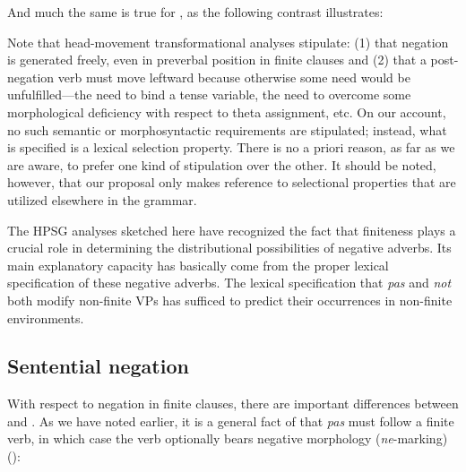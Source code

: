\documentclass[output=paper
 	        ,biblatex
                ,babelshorthands
                ,newtxmath
                ,draftmode
                ,colorlinks, citecolor=brown
]{langscibook}
\begin{document}
\begin{exe}
\begin{xlist}
\begin{exe}
\begin{xlist}
\noindent And much the same is true for , as the
following contrast illustrates:

\eal
\ex[*]{
\gll Robin  [(ne) pas \jbssub{VP[\textit{fin}]}[aime  Stacy]]. \\
     Robin  [(ne) not {\jbssub{VP[\textit{fin}]}[}likes Stacy] \\
}
\zl


Note that head-movement transformational analyses stipulate: (1) that negation
is generated freely, even in preverbal position in finite clauses and (2) that
a post-negation verb must move leftward because otherwise some need would be
unfulfilled---the need to bind a tense variable, the need to overcome some
morphological deficiency with respect to theta assignment, etc. On our
account, no such semantic or morphosyntactic requirements are stipulated;
instead, what is specified is a lexical selection property. There is no a
priori reason, as far as we are aware, to prefer one kind of stipulation over
the other. It should be noted, however, that our proposal only makes reference
to selectional properties that are utilized elsewhere in the grammar.
\fi


The HPSG analyses sketched here have recognized
the fact that finiteness plays a crucial role in
determining the distributional possibilities of negative
adverbs. Its main explanatory capacity
has basically come from the proper lexical specification of these negative
adverbs. The lexical specification that \textit{pas} and
\textit{not} both modify non-finite VPs has sufficed to predict their
occurrences in non-finite environments.



\subsection{Sentential negation}
\label{sec-sentential-negation}\label{negation:sec-sentential-negation}

With respect to negation in finite clauses, there are important differences between  and .
As we have noted earlier, it is a general fact of  that \textit{pas} must follow a finite verb, in which case the verb optionally bears negative morphology (\textit{ne}-marking) (\citealp[]{KS:02}):


\end{xlist}
\end{exe}
\end{xlist}
\end{exe}
\end{document}

